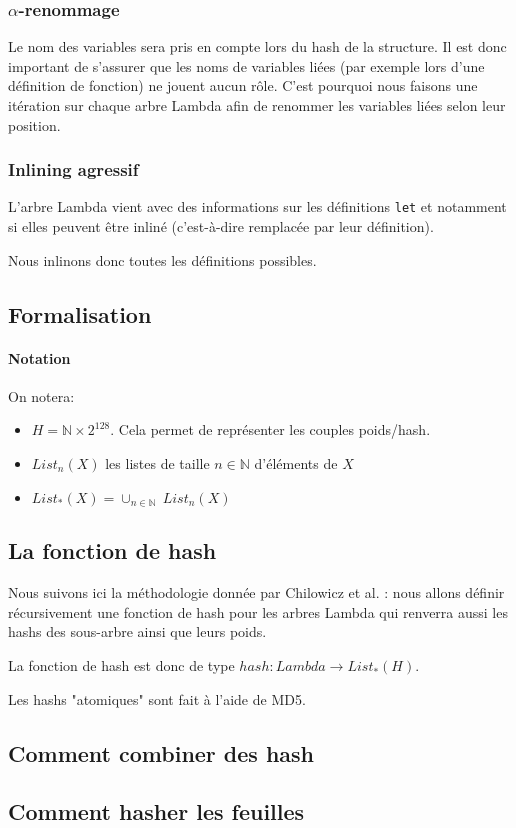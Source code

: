 \subsubsection{$\alpha$-renommage}

Le nom des variables sera pris en compte lors du hash de la
structure. Il est donc important de s'assurer que les noms de
variables liées (par exemple lors d'une définition de fonction) ne
jouent aucun rôle.  C'est pourquoi nous faisons une itération sur
chaque arbre Lambda afin de renommer les variables liées selon leur
position.

\subsubsection{Inlining agressif}

L'arbre Lambda vient avec des informations sur les définitions
\verb|let| et notamment si elles peuvent être inliné (c'est-à-dire
remplacée par leur définition).

Nous inlinons donc toutes les définitions possibles.

\subsection{Formalisation}
\label{sec:fingerprint}

\paragraph{Notation}
On notera:

\begin{itemize}
	\item $H = \mathbb{N} \times 2^{128}$. Cela permet de représenter les couples poids/hash.
	\item $List_n(X)$ les listes de taille $n \in \mathbb{N}$ d'éléments de $X$
	\item $List_*(X) = \cup_{n\in\mathbb{N}}\ List_n(X)$
\end{itemize}

\subsection{La fonction de hash}

Nous suivons ici la méthodologie donnée par Chilowicz et
al. \cite{chilowicz:hal-00627811}: nous allons définir récursivement
une fonction de hash pour les arbres Lambda qui renverra aussi les
hashs des sous-arbre ainsi que leurs poids.

La fonction de hash est donc de type $hash : Lambda \to List_*(H)$.

Les hashs "atomiques" sont fait à l'aide de MD5.

\subsection{Comment combiner des hash}

\subsection{Comment hasher les feuilles}

